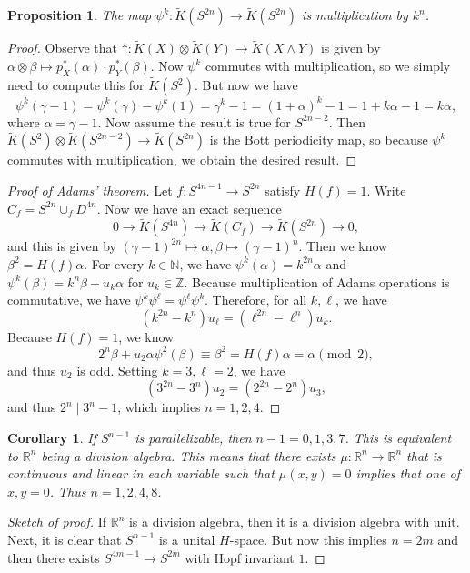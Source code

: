\documentclass[leqno, openany]{memoir}
\newtheorem{cor}[thm]{Corollary}
\newtheorem{prop}[thm]{Proposition}
\theoremstyle{definition}
\theoremstyle{remark}
\theoremstyle{plain}
\theoremstyle{definition}
\theoremstyle{remark}
\newcommand{\N}{\mathbb{N}}
\newcommand{\R}{\mathbb{R}}
\newcommand{\Z}{\mathbb{Z}}
\newcommand{\wt}[1]{\widetilde{#1}}
\begin{document}
\begin{prop}
    The map $\psi^k \colon \wt{K}(S^{2n}) \to \wt{K}(S^{2n})$ is multiplication by $k^n$.
\end{prop}

\begin{proof}
    Observe that $* \colon \wt{K}(X) \otimes \wt{K}(Y) \to \wt{K}(X \wedge Y)$ is given by $\alpha \otimes \beta \mapsto p_X^*(\alpha) \cdot p_Y^*(\beta)$. Now $\psi^k$ commutes with multiplication, so we simply need to compute this for $\wt{K}(S^2)$. But now we have
    \[ \psi^k(\gamma - 1) = \psi^k(\gamma) - \psi^k(1) = \gamma^k - 1 = { (1+\alpha) }^k - 1 = 1 + k\alpha - 1 = k \alpha, \]
    where $\alpha = \gamma - 1$. Now assume the result is true for $S^{2n-2}$. Then $\wt{K}(S^2) \otimes \wt{K}(S^{2n-2}) \to \wt{K}(S^{2n})$ is the Bott periodicity map, so because $\psi^k$ commutes with multiplication, we obtain the desired result.
\end{proof}

\begin{proof}[Proof of Adams' theorem]
    Let $f \colon S^{4n-1} \to S^{2n}$ satisfy $H(f) = 1$. Write $C_f = S^{2n} \cup_f D^{4n}$. Now we have an exact sequence
    \[ 0 \to \wt{K}(S^{4n}) \to \wt{K}(C_f) \to \wt{K}(S^{2n}) \to 0, \]
    and this is given by ${(\gamma-1)}^{2n} \mapsto \alpha, \beta \mapsto {(\gamma-1)}^n$. Then we know $\beta^2 = H(f) \alpha$. For every $k \in \N$, we have $\psi^k(\alpha) = k^{2n} \alpha$ and $\psi^k(\beta) = k^n \beta + u_k \alpha$ for $u_k \in \Z$. Because multiplication of Adams operations is commutative, we have $\psi^k \psi^{\ell} = \psi^{\ell} \psi^k$. Therefore, for all $k, \ell$, we have
    \[ (k^{2n}-k^n) u_{\ell} = (\ell^{2n} - \ell^n) u_k. \]
    Because $H(f) = 1$, we know 
    \[ 2^n \beta + u_2 \alpha \psi^2(\beta) \equiv \beta^2 = H(f) \alpha = \alpha \pmod{2}, \]
    and thus $u_2$ is odd. Setting $k=3, \ell=2$, we have
    \[ (3^{2n} - 3^n) u_2 = (2^{2n} - 2^n) u_3, \]
    and thus $2^n \mid 3^n - 1$, which implies $n = 1,2,4$.
\end{proof}

\begin{cor}
    If $S^{n-1}$ is parallelizable, then $n - 1 = 0,1,3,7$. This is equivalent to $\R^n$ being a division algebra. This means that there exists $\mu \colon \R^n \to \R^n$ that is continuous and linear in each variable such that $\mu(x,y) = 0$ implies that one of $x,y = 0$. Thus $n=1,2,4,8$.
\end{cor}

\begin{proof}[Sketch of proof]
    If $\R^n$ is a division algebra, then it is a division algebra with unit. Next, it is clear that $S^{n-1}$ is a unital $H$-space. But now this implies $n = 2m$ and then there exists $S^{4m-1} \to S^{2m}$ with Hopf invariant $1$.
\end{proof}
\end{document}
